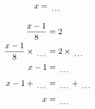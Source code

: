 \documentclass[12pt]{article}
\newcounter{minipagecount}
\begin{document}
\begin{multicols}{2}
\begin{minipage}[t]{0.45\textwidth}
\begin{align*}
        x &= \dotuline{\hspace{5mm}}\\
    \end{align*}
\end{minipage}\columnbreak
\noindent{(\theminipagecount)}\hspace{0.1mm} %
\begin{minipage}[t]{0.45\textwidth} %
    \vspace{-26pt}  %
    \raggedright %
    \begin{align*} %
        \frac{x - 1}{8} &= 2\\
        \frac{x - 1}{8} \times\dotuline{\hspace{5mm}} &= 2 \times\dotuline{\hspace{5mm}}\\
        x - 1 &= \dotuline{\hspace{5mm}}\\
        x - 1 + \dotuline{\hspace{5mm}} &= \dotuline{\hspace{5mm}} + \dotuline{\hspace{5mm}}\\
        x &= \dotuline{\hspace{5mm}}\\
    \end{align*}
\end{minipage} %
\noindent{(\theminipagecount)}\hspace{0.1mm} %
\begin{minipage}[t]{0.45\textwidth} %
    \vspace{-26pt}  %

\end{minipage}
\end{multicols}
\end{document}
